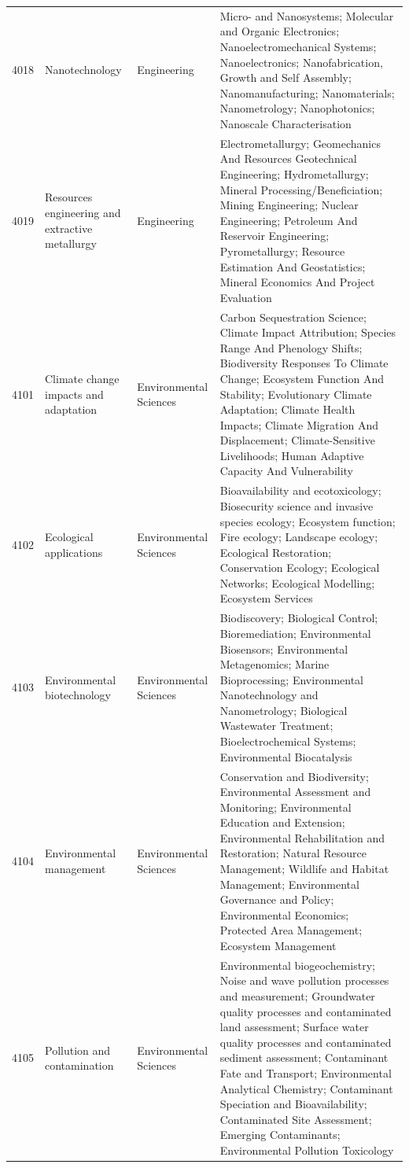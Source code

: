 \begin{longtable}{r p{2.45cm} p{2.55cm} p{6.15cm}}
4018 & Nanotechnology & Engineering & Micro- and Nanosystems; Molecular and Organic Electronics; Nanoelectromechanical Systems; Nanoelectronics; Nanofabrication, Growth and Self Assembly; Nanomanufacturing; Nanomaterials; Nanometrology; Nanophotonics; Nanoscale Characterisation \\
4019 & Resources engineering and extractive metallurgy & Engineering & Electrometallurgy; Geomechanics And Resources Geotechnical Engineering; Hydrometallurgy; Mineral Processing/Beneficiation; Mining Engineering; Nuclear Engineering; Petroleum And Reservoir Engineering; Pyrometallurgy; Resource Estimation And Geostatistics; Mineral Economics And Project Evaluation \\
4101 & Climate change impacts and adaptation & Environmental Sciences & Carbon Sequestration Science; Climate Impact Attribution; Species Range And Phenology Shifts; Biodiversity Responses To Climate Change; Ecosystem Function And Stability; Evolutionary Climate Adaptation; Climate Health Impacts; Climate Migration And Displacement; Climate-Sensitive Livelihoods; Human Adaptive Capacity And Vulnerability \\
4102 & Ecological applications & Environmental Sciences & Bioavailability and ecotoxicology; Biosecurity science and invasive species ecology; Ecosystem function; Fire ecology; Landscape ecology; Ecological Restoration; Conservation Ecology; Ecological Networks; Ecological Modelling; Ecosystem Services \\
4103 & Environmental biotechnology & Environmental Sciences & Biodiscovery; Biological Control; Bioremediation; Environmental Biosensors; Environmental Metagenomics; Marine Bioprocessing; Environmental Nanotechnology and Nanometrology; Biological Wastewater Treatment; Bioelectrochemical Systems; Environmental Biocatalysis \\
4104 & Environmental management & Environmental Sciences & Conservation and Biodiversity; Environmental Assessment and Monitoring; Environmental Education and Extension; Environmental Rehabilitation and Restoration; Natural Resource Management; Wildlife and Habitat Management; Environmental Governance and Policy; Environmental Economics; Protected Area Management; Ecosystem Management \\
4105 & Pollution and contamination & Environmental Sciences & Environmental biogeochemistry; Noise and wave pollution processes and measurement; Groundwater quality processes and contaminated land assessment; Surface water quality processes and contaminated sediment assessment; Contaminant Fate and Transport; Environmental Analytical Chemistry; Contaminant Speciation and Bioavailability; Contaminated Site Assessment; Emerging Contaminants; Environmental Pollution Toxicology \\

\end{longtable}
